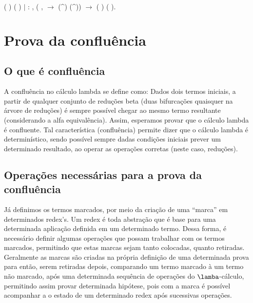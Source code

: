 \begin{coqdoccode}
\coqdocindent{15.50em}
  ( ) ( )\coqdoceol
\coqdocindent{1.00em}
\ensuremath{|}  : \coqdockw{\ensuremath{\forall}}   , (\coqdockw{\ensuremath{\forall}} ,    \ensuremath{\rightarrow}   (\^{}) (\^{})) \ensuremath{\rightarrow}\coqdoceol
\coqdocindent{15.50em}
  ( ) ( ).\coqdoceol
\coqdocemptyline
\end{coqdoccode}
\section{Prova da confluência}



\subsection{O que é confluência}



 A confluência no cálculo lambda se define como: Dados dois termos iniciais,
a partir de qualquer conjunto de reduções beta (duas bifurcações quaisquer na árvore de reduções)
 é sempre possível chegar ao mesmo termo resultante (considerando a alfa equivalência). 
Assim, esperamos provar que o cálculo lambda é confluente. Tal característica (confluência) 
permite dizer que o cálculo lambda é determinístico, sendo possível sempre dadas condições iniciais
prever um determinado resultado, ao operar as operações corretas (neste caso, reduções). 

\subsection{Operações necessárias para a prova da confluência}



 Já definimos os termos marcados, por meio da criação de uma ``marca'' em determinados redex's. Um
redex é toda abstração que é base para uma determinada aplicação definida em um determinado termo. Dessa forma, é
necessário definir algumas operações que possam trabalhar com os termos marcados, permitindo que estas marcas
sejam tanto colocadas, quanto retiradas. Geralmente as marcas são criadas na própria definição de uma determinada prova
para então, serem retiradas depois, comparando um termo marcado à um termo não marcado, após uma determinada
sequência de operações do $\lamba$-cálculo, permitindo assim provar determinada hipótese, pois com a marca
é possível acompanhar a o estado de um determinado redex após sucessivas operações. 

